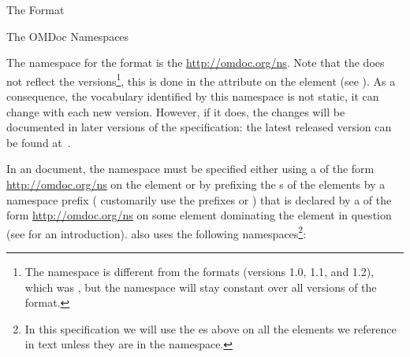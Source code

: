 \begin{omgroup}[creators=miko,id=spec-intro]{The {\omdoc} Format}
\begin{omgroup}[id=omdoc-ns]{The OMDoc Namespaces}

The namespace for the {} format is the 
\url{http://omdoc.org/ns}. Note that the {\omdoc} 
does not reflect the versions\footnote{The namespace is different from the {}
  formats (versions 1.0, 1.1, and 1.2), which was
  {}, but the {} namespace will stay
  constant over all versions of the {} format.}, this is done in the
{} attribute on the {} element
{} (see {}).  As a consequence, the
{\omdoc} vocabulary identified by this namespace is not static, it can change with each
new {\omdoc} version. However, if it does, the changes will be documented in later
versions of the specification: the latest released version can be found
at~\cite{URL:omdocspec}.

In an {\omdoc} document, the {\omdoc} namespace must be specified either using a
{} of the form
{}\url{http://omdoc.org/ns}{} on the {} element
or by prefixing the {s} of the {\omdoc} elements by a namespace
prefix ({\omdoc} customarily use the prefixes {} or {}) that
is declared by a {} of the form
{}\url{http://omdoc.org/ns}{} on some element dominating the
{\omdoc} element in question (see {} for an introduction). {\omdoc} also
uses the following namespaces\footnote{In this specification we will use the
  {es} above on all the elements we reference in text unless
  they are in the {\omdoc} namespace.}:


\end{omgroup}
\end{omgroup}
